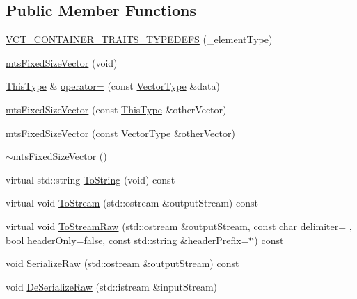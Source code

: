\subsection*{Public Member Functions}
\begin{DoxyCompactItemize}
\item 
\hyperlink{classmts_fixed_size_vector_ac0fb65b6aaa65a9f41f8133af4f0790a}{V\+C\+T\+\_\+\+C\+O\+N\+T\+A\+I\+N\+E\+R\+\_\+\+T\+R\+A\+I\+T\+S\+\_\+\+T\+Y\+P\+E\+D\+E\+F\+S} (\+\_\+element\+Type)
\item 
\hyperlink{classmts_fixed_size_vector_a67b73e64d28ba115f404a75885d38fbd}{mts\+Fixed\+Size\+Vector} (void)
\item 
\hyperlink{classvct_fixed_size_const_vector_base_a071063bc4fa43112cc287b2dbef53180}{This\+Type} \& \hyperlink{classmts_fixed_size_vector_ac2a893cd8e28d1763e0191ec0cb42de4}{operator=} (const \hyperlink{classmts_fixed_size_vector_ac5c774708b6dab6c0fe332c5fcd2c5ad}{Vector\+Type} \&data)
\item 
\hyperlink{classmts_fixed_size_vector_ab6cecc2d95a42c5c8699aa4bd7c41059}{mts\+Fixed\+Size\+Vector} (const \hyperlink{classvct_fixed_size_const_vector_base_a071063bc4fa43112cc287b2dbef53180}{This\+Type} \&other\+Vector)
\item 
\hyperlink{classmts_fixed_size_vector_a2c1b3efb6b5de2c43d711dcbc99fec41}{mts\+Fixed\+Size\+Vector} (const \hyperlink{classmts_fixed_size_vector_ac5c774708b6dab6c0fe332c5fcd2c5ad}{Vector\+Type} \&other\+Vector)
\item 
\hyperlink{classmts_fixed_size_vector_a8d9f7fad00c8c072417bc9427018ad2c}{$\sim$mts\+Fixed\+Size\+Vector} ()
\item 
virtual std\+::string \hyperlink{classmts_fixed_size_vector_a318f3eb6372065a90888e5b0cc01ae34}{To\+String} (void) const 
\item 
virtual void \hyperlink{classmts_fixed_size_vector_ad25311e7d7650747d5261a4c5de2a26a}{To\+Stream} (std\+::ostream \&output\+Stream) const 
\item 
virtual void \hyperlink{classmts_fixed_size_vector_ac057837550f642d88932a66ab13f5215}{To\+Stream\+Raw} (std\+::ostream \&output\+Stream, const char delimiter= \textquotesingle{} \textquotesingle{}, bool header\+Only=false, const std\+::string \&header\+Prefix=\char`\"{}\char`\"{}) const 
\item 
void \hyperlink{classmts_fixed_size_vector_a35d316468abf5e8d78841d0a0525f063}{Serialize\+Raw} (std\+::ostream \&output\+Stream) const 
\item 
void \hyperlink{classmts_fixed_size_vector_a353769eeb40e54bcdae6aaf23c1e5748}{De\+Serialize\+Raw} (std\+::istream \&input\+Stream)
\end{DoxyCompactItemize}
